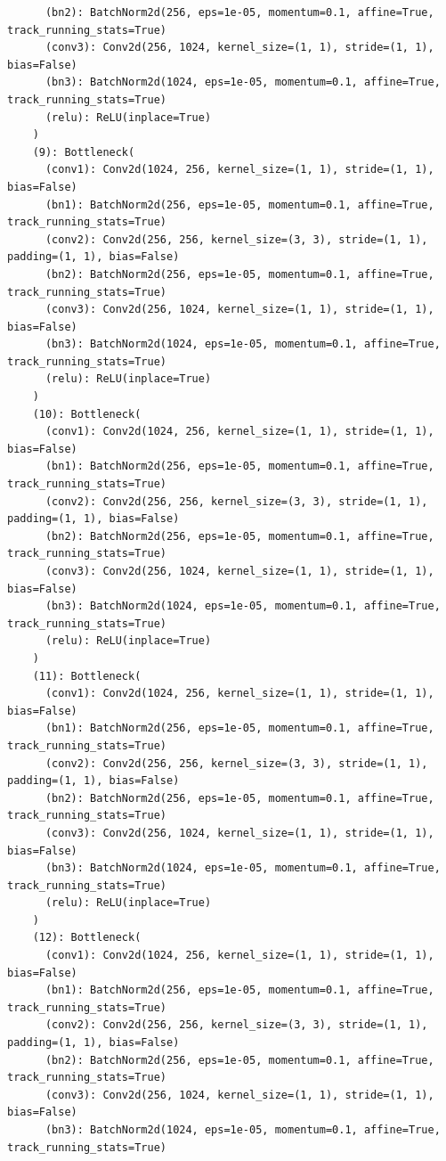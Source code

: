 \documentclass{article}
\begin{document}
\begin{verbatim}
      (bn2): BatchNorm2d(256, eps=1e-05, momentum=0.1, affine=True, track_running_stats=True)
      (conv3): Conv2d(256, 1024, kernel_size=(1, 1), stride=(1, 1), bias=False)
      (bn3): BatchNorm2d(1024, eps=1e-05, momentum=0.1, affine=True, track_running_stats=True)
      (relu): ReLU(inplace=True)
    )
    (9): Bottleneck(
      (conv1): Conv2d(1024, 256, kernel_size=(1, 1), stride=(1, 1), bias=False)
      (bn1): BatchNorm2d(256, eps=1e-05, momentum=0.1, affine=True, track_running_stats=True)
      (conv2): Conv2d(256, 256, kernel_size=(3, 3), stride=(1, 1), padding=(1, 1), bias=False)
      (bn2): BatchNorm2d(256, eps=1e-05, momentum=0.1, affine=True, track_running_stats=True)
      (conv3): Conv2d(256, 1024, kernel_size=(1, 1), stride=(1, 1), bias=False)
      (bn3): BatchNorm2d(1024, eps=1e-05, momentum=0.1, affine=True, track_running_stats=True)
      (relu): ReLU(inplace=True)
    )
    (10): Bottleneck(
      (conv1): Conv2d(1024, 256, kernel_size=(1, 1), stride=(1, 1), bias=False)
      (bn1): BatchNorm2d(256, eps=1e-05, momentum=0.1, affine=True, track_running_stats=True)
      (conv2): Conv2d(256, 256, kernel_size=(3, 3), stride=(1, 1), padding=(1, 1), bias=False)
      (bn2): BatchNorm2d(256, eps=1e-05, momentum=0.1, affine=True, track_running_stats=True)
      (conv3): Conv2d(256, 1024, kernel_size=(1, 1), stride=(1, 1), bias=False)
      (bn3): BatchNorm2d(1024, eps=1e-05, momentum=0.1, affine=True, track_running_stats=True)
      (relu): ReLU(inplace=True)
    )
    (11): Bottleneck(
      (conv1): Conv2d(1024, 256, kernel_size=(1, 1), stride=(1, 1), bias=False)
      (bn1): BatchNorm2d(256, eps=1e-05, momentum=0.1, affine=True, track_running_stats=True)
      (conv2): Conv2d(256, 256, kernel_size=(3, 3), stride=(1, 1), padding=(1, 1), bias=False)
      (bn2): BatchNorm2d(256, eps=1e-05, momentum=0.1, affine=True, track_running_stats=True)
      (conv3): Conv2d(256, 1024, kernel_size=(1, 1), stride=(1, 1), bias=False)
      (bn3): BatchNorm2d(1024, eps=1e-05, momentum=0.1, affine=True, track_running_stats=True)
      (relu): ReLU(inplace=True)
    )
    (12): Bottleneck(
      (conv1): Conv2d(1024, 256, kernel_size=(1, 1), stride=(1, 1), bias=False)
      (bn1): BatchNorm2d(256, eps=1e-05, momentum=0.1, affine=True, track_running_stats=True)
      (conv2): Conv2d(256, 256, kernel_size=(3, 3), stride=(1, 1), padding=(1, 1), bias=False)
      (bn2): BatchNorm2d(256, eps=1e-05, momentum=0.1, affine=True, track_running_stats=True)
      (conv3): Conv2d(256, 1024, kernel_size=(1, 1), stride=(1, 1), bias=False)
      (bn3): BatchNorm2d(1024, eps=1e-05, momentum=0.1, affine=True, track_running_stats=True)

\end{verbatim}
\end{document}
